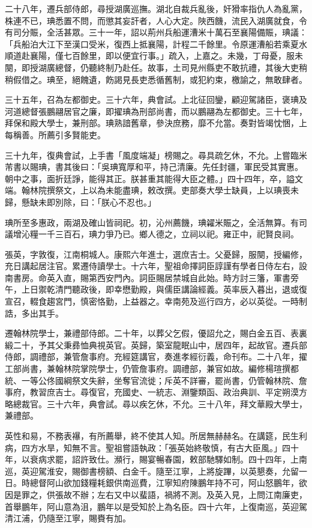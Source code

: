 \begin{pinyinscope}
二十八年，遷兵部侍郎，尋授湖廣巡撫。湖北自裁兵亂後，奸猾率指仇人為亂黨，株連不已，琠悉置不問，而懲其妄訐者，人心大定。陜西饑，流民入湖廣就食，令有司分賑，全活甚眾。三十一年，詔以荊州兵船運漕米十萬石至襄陽備賑，琠議：「兵船泊大江下至漢口受米，復西上抵襄陽，計程二千餘里。令原運漕船若乘夏水順道赴襄陽，僅七百餘里，即以便宜行事。」疏入，上嘉之。未幾，丁母憂，服未闋，即授湖廣總督，仍聽終制乃赴任。故事，土司見州縣吏不敢抗禮，其後大吏稍稍假借之。琠至，絕餽遺，飭謁見長吏悉循舊制，或犯約束，檄諭之，無敢肆者。

三十五年，召為左都御史。三十六年，典會試。上北征回鑾，顧迎駕諸臣，褒琠及河道總督張鵬翮居官之廉，即擢琠為刑部尚書，而以鵬翮為左都御史。三十七年，拜保和殿大學士，兼刑部。琠熟諳舊章，參決庶務，靡不允當。奏對皆竭忱悃，上每稱善。所薦引多賢能吏。

三十九年，復典會試，上手書「風度端凝」榜賜之。尋具疏乞休，不允。上嘗臨米芾書以賜琠，書其後曰：「吳琠寬厚和平，持己清廉。先任封疆，軍民受其實惠。朝中之事，面折廷諍，能得其正。朕甚重其能得大臣之體。」四十四年，卒，謚文端。翰林院撰祭文，上以為未能盡琠，敕改撰。吏部奏大學士缺員，上以琠喪未歸，懸缺未即別除，曰：「朕心不忍也。」

琠所至多惠政，兩湖及確山皆祠祀。初，沁州薦饑，琠糴米賑之，全活無算。有司議增沁糧一千三百石，琠力爭乃已。鄉人德之，立祠以祀。雍正中，祀賢良祠。

張英，字敦復，江南桐城人。康熙六年進士，選庶吉士。父憂歸，服闋，授編修，充日講起居注官。累遷侍讀學士。十六年，聖祖命擇詞臣諄謹有學者日侍左右，設南書房。命英入直，賜第西安門內。詞臣賜居禁城自此始。時方討三籓，軍書旁午，上日禦乾清門聽政後，即幸懋勤殿，與儒臣講論經義。英率辰入暮出，退或復宣召，輟食趨宮門，慎密恪勤，上益器之。幸南苑及巡行四方，必以英從。一時制誥，多出其手。

遷翰林院學士，兼禮部侍郎。二十年，以葬父乞假，優詔允之，賜白金五百、表裏緞二十，予其父秉彞恤典視英官。英歸，築室龍眠山中，居四年，起故官。遷兵部侍郎，調禮部，兼管詹事府。充經筵講官，奏進孝經衍義，命刊布。二十八年，擢工部尚書，兼翰林院掌院學士，仍管詹事府。調禮部，兼官如故。編修楊瑄撰都統、一等公佟國綱祭文失辭，坐奪官流徙；斥英不詳審，罷尚書，仍管翰林院、詹事府，教習庶吉士。尋復官，充國史、一統志、淵鑒類函、政治典訓、平定朔漠方略總裁官。三十六年，典會試。尋以疾乞休，不允。三十八年，拜文華殿大學士，兼禮部。

英性和易，不務表襮，有所薦舉，終不使其人知。所居無赫赫名。在講筵，民生利病，四方水旱，知無不言。聖祖嘗語執政：「張英始終敬慎，有古大臣風。」四十年，以衰病求罷，詔許致仕。瀕行，賜宴暢春園，敕部馳驛如制。四十四年，上南巡，英迎駕淮安，賜御書榜額、白金千。隨至江寧，上將旋蹕，以英懇奏，允留一日。時總督阿山欲加錢糧耗銀供南巡費，江寧知府陳鵬年持不可，阿山怒鵬年，欲因是罪之，供張故不辦；左右又中以蜚語，禍將不測。及英入見，上問江南廉吏，首舉鵬年，阿山意為沮，鵬年以是受知於上為名臣。四十六年，上復南巡，英迎駕清江浦，仍隨至江寧，賜賚有加。


\end{pinyinscope}
